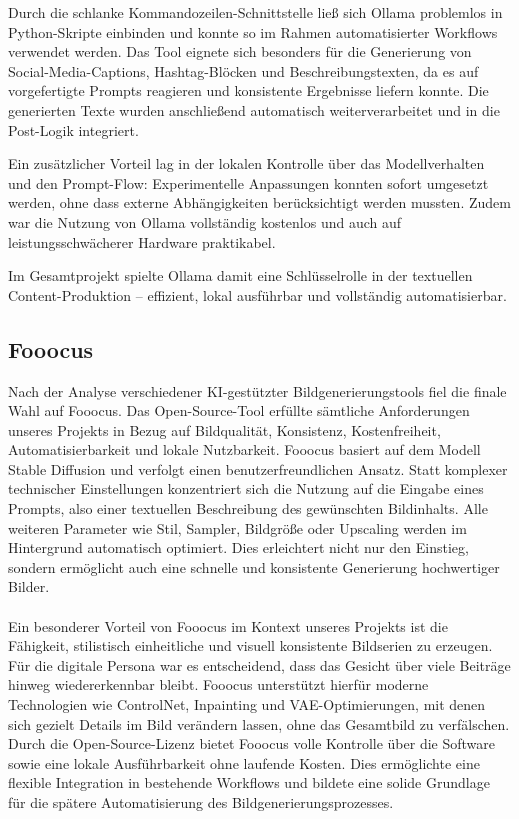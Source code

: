 \documentclass[a4paper,12pt]{article}
\begin{document}
Durch die schlanke Kommandozeilen-Schnittstelle ließ sich Ollama problemlos in Python-Skripte einbinden und konnte so im Rahmen automatisierter Workflows verwendet werden. Das Tool eignete sich besonders für die Generierung von Social-Media-Captions, Hashtag-Blöcken und Beschreibungstexten, da es auf vorgefertigte Prompts reagieren und konsistente Ergebnisse liefern konnte. Die generierten Texte wurden anschließend automatisch weiterverarbeitet und in die Post-Logik integriert.

Ein zusätzlicher Vorteil lag in der lokalen Kontrolle über das Modellverhalten und den Prompt-Flow: Experimentelle Anpassungen konnten sofort umgesetzt werden, ohne dass externe Abhängigkeiten berücksichtigt werden mussten. Zudem war die Nutzung von Ollama vollständig kostenlos und auch auf leistungsschwächerer Hardware praktikabel.

Im Gesamtprojekt spielte Ollama damit eine Schlüsselrolle in der textuellen Content-Produktion – effizient, lokal ausführbar und vollständig automatisierbar.

\subsection{Fooocus}

Nach der Analyse verschiedener KI-gestützter Bildgenerierungstools fiel die finale Wahl auf Fooocus. Das Open-Source-Tool erfüllte sämtliche Anforderungen unseres Projekts in Bezug auf Bildqualität, Konsistenz, Kostenfreiheit, Automatisierbarkeit und lokale Nutzbarkeit.
Fooocus basiert auf dem Modell Stable Diffusion und verfolgt einen benutzerfreundlichen Ansatz. Statt komplexer technischer Einstellungen konzentriert sich die Nutzung auf die Eingabe eines Prompts, also einer textuellen Beschreibung des gewünschten Bildinhalts. Alle weiteren Parameter wie Stil, Sampler, Bildgröße oder Upscaling werden im Hintergrund automatisch optimiert. Dies erleichtert nicht nur den Einstieg, sondern ermöglicht auch eine schnelle und konsistente Generierung hochwertiger Bilder. \\\\
Ein besonderer Vorteil von Fooocus im Kontext unseres Projekts ist die Fähigkeit, stilistisch einheitliche und visuell konsistente Bildserien zu erzeugen. Für die digitale Persona war es entscheidend, dass das Gesicht über viele Beiträge hinweg wiedererkennbar bleibt. Fooocus unterstützt hierfür moderne Technologien wie ControlNet, Inpainting und VAE-Optimierungen, mit denen sich gezielt Details im Bild verändern lassen, ohne das Gesamtbild zu verfälschen.
Durch die Open-Source-Lizenz bietet Fooocus volle Kontrolle über die Software sowie eine lokale Ausführbarkeit ohne laufende Kosten. Dies ermöglichte eine flexible Integration in bestehende Workflows und bildete eine solide Grundlage für die spätere Automatisierung des Bildgenerierungsprozesses.
\end{document}
